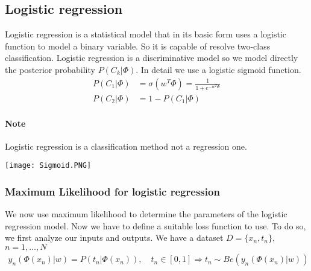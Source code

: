\documentclass[main.tex]{subfiles}
\begin{document}
\newpage
\subsection{Logistic regression}
Logistic regression is a statistical model that in its basic form uses a logistic function to model a binary variable. So it is capable of resolve two-class classification.
Logistic regression is a discriminative model so we model directly the posterior probability $P(C_k|\Phi)$. In detail we use a logistic sigmoid function\footnotemark.
\begin{align}
    P(C_1|\Phi) &= \sigma(w^T \Phi) = \frac{1}{1+e^{-w^T\Phi}} \\
    P(C_2|\Phi) &= 1- P(C_1|\Phi)
\end{align}

\paragraph{Note} Logistic regression is a classification method not a regression one.

\begin{center}
    \texttt{[image: Sigmoid.PNG]}
\end{center}

\subsubsection{Maximum Likelihood for logistic regression}
We now use maximum likelihood to determine the parameters of the logistic regression model. Now we have to define a suitable loss function to use. To do so, we first analyze our inputs and outputs. We have a dataset $D = \{x_n, t_n\},$ $n=1,\dots,N$
\begin{align*}
    y_n(\Phi(x_n)|w) = P(t_n|\Phi(x_n)), \quad t_n \in [0,1] \Rightarrow t_n \sim Be(y_n(\Phi(x_n)|w))
\end{align*}
\end{document}
